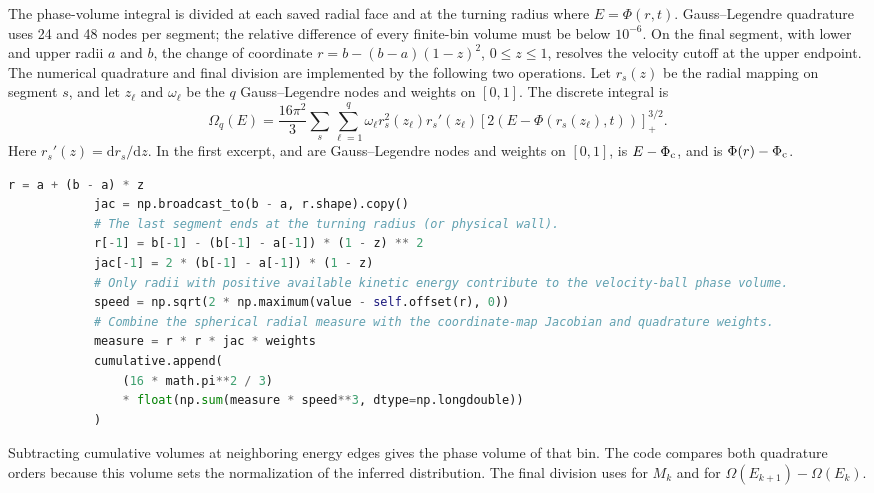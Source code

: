 The phase-volume integral is divided at each saved radial face and at
the turning radius where $E=\Phi(r,t)$. Gauss--Legendre quadrature uses
24 and 48 nodes per segment; the relative difference of every finite-bin
volume must be below $10^{-6}$. On the final segment, with lower and upper radii $a$ and $b$, the change of
coordinate $r=b-(b-a)(1-z)^2$, $0\le z\le1$, resolves the velocity cutoff
at the upper endpoint. The numerical quadrature and final division are
implemented by the following two operations. Let $r_s(z)$ be the radial
mapping on segment $s$, and let $z_\ell$ and $\omega_\ell$ be the $q$
Gauss--Legendre nodes and weights on $[0,1]$. The discrete integral is
\begin{equation}
 \boxed{\Omega_q(E)=\frac{16\pi^2}{3}
 \sum_s\sum_{\ell=1}^q\omega_\ell r_s^2(z_\ell)r_s'(z_\ell)
 [2(E-\Phi(r_s(z_\ell),t))]_+^{3/2}.}
 \label{eq:df-analysis-quadrature}
\end{equation}
Here $r_s'(z)=\mathrm dr_s/\mathrm dz$. In the first excerpt,
 and  are Gauss--Legendre nodes and weights on
$[0,1]$,  is $E-\Phi_{\rm c}$, and
 is $\Phi(r)-\Phi_{\rm c}$.
\begin{lstlisting}[language=Python]
            r = a + (b - a) * z
            jac = np.broadcast_to(b - a, r.shape).copy()
            # The last segment ends at the turning radius (or physical wall).
            r[-1] = b[-1] - (b[-1] - a[-1]) * (1 - z) ** 2
            jac[-1] = 2 * (b[-1] - a[-1]) * (1 - z)
            # Only radii with positive available kinetic energy contribute to the velocity-ball phase volume.
            speed = np.sqrt(2 * np.maximum(value - self.offset(r), 0))
            # Combine the spherical radial measure with the coordinate-map Jacobian and quadrature weights.
            measure = r * r * jac * weights
            cumulative.append(
                (16 * math.pi**2 / 3)
                * float(np.sum(measure * speed**3, dtype=np.longdouble))
            )
\end{lstlisting}
Subtracting cumulative volumes at neighboring energy edges gives the phase
volume of that bin. The code compares both quadrature orders because this
volume sets the normalization of the inferred distribution.
The final division uses  for $M_k$ and
 for $\Omega(E_{k+1})-\Omega(E_k)$.
